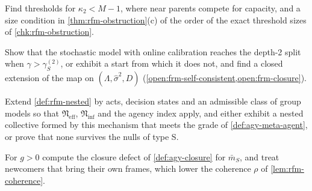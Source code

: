 \begin{openproblem}\label{open:rfm-competing}
Find thresholds for $\kappa_2<M-1$, where near parents compete for capacity, and a size condition in \cref{thm:rfm-obstruction}(c) of the order of the exact threshold sizes of \cref{chk:rfm-obstruction}.
\end{openproblem}

\begin{openproblem}\label{open:rfm-online}
Show that the stochastic model with online calibration reaches the depth-2 split when $\gamma>\gamma_S^{(2)}$, or exhibit a start from which it does not, and find a closed extension of the map on $(\Lambda,\hat\sigma^2,D)$ (\cref{open:frm-self-consistent,open:frm-closure}).
\end{openproblem}

\begin{openproblem}\label{open:rfm-agent}
Extend \cref{def:rfm-nested} by acts, decision states and an admissible class of group models so that $\mathfrak N_{\mathrm{eff}}$, $\mathfrak N_{\mathrm{inf}}$ and the agency index apply, and either exhibit a nested collective formed by this mechanism that meets the grade of \cref{def:agy-meta-agent}, or prove that none survives the nulls of type S.
\end{openproblem}

\begin{openproblem}\label{open:rfm-turnover}
For $g>0$ compute the closure defect of \cref{def:agy-closure} for $\bar m_S$, and treat newcomers that bring their own frames, which lower the coherence $\rho$ of \cref{lem:rfm-coherence}.
\end{openproblem}
